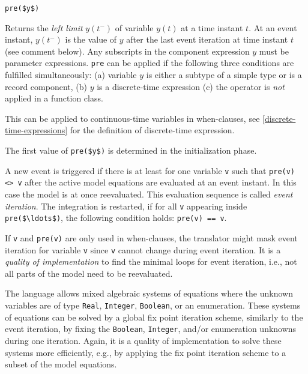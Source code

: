 \begin{operatordefinition}[pre]
\begin{synopsis}\begin{lstlisting}
pre($y$)
\end{lstlisting}\end{synopsis}
\begin{semantics}
Returns the \emph{left limit} $y(t^{-})$ of variable $y(t)$ at a time instant $t$.  At an event instant, $y(t^{-})$ is the value of $y$ after the last event iteration at time instant $t$ (see comment below). Any subscripts in the component expression $y$ must be parameter expressions.  \lstinline!pre! can be applied if the following three conditions are fulfilled simultaneously: (a) variable $y$ is either a subtype of a simple type or is a record component, (b) $y$ is a discrete-time expression (c) the operator is \emph{not} applied in a function class.
\begin{nonnormative}
This can be applied to continuous-time variables in when-clauses, see \cref{discrete-time-expressions} for the definition of discrete-time expression.
\end{nonnormative}
The first value of \lstinline!pre($y$)! is determined in the initialization phase.

A new event is triggered if there is at least for one variable \lstinline!v! such that \lstinline!pre(v) <> v! after the active model equations are evaluated at an event instant.  In this case the model is at once reevaluated.  This evaluation sequence is called \emph{event iteration}.  The integration is restarted, if for all \lstinline!v! appearing inside \lstinline!pre($\ldots$)!, the following condition holds: \lstinline!pre(v) == v!.

\begin{nonnormative}
If \lstinline!v! and \lstinline!pre(v)! are only used in when-clauses, the translator might mask event iteration for variable \lstinline!v! since \lstinline!v! cannot change during event iteration.  It is a \emph{quality of implementation} to find the minimal loops for event iteration, i.e., not all parts of the model need to be reevaluated.

The language allows mixed algebraic systems of equations where the unknown variables are of type \lstinline!Real!, \lstinline!Integer!, \lstinline!Boolean!, or an enumeration.  These systems of equations can be solved by a global fix point iteration scheme, similarly to the event iteration, by fixing the \lstinline!Boolean!, \lstinline!Integer!, and/or enumeration unknowns during one iteration.  Again, it is a quality of implementation to solve these systems more efficiently, e.g., by applying the fix point iteration scheme to a subset of the model equations.
\end{nonnormative}
\end{semantics}
\end{operatordefinition}

